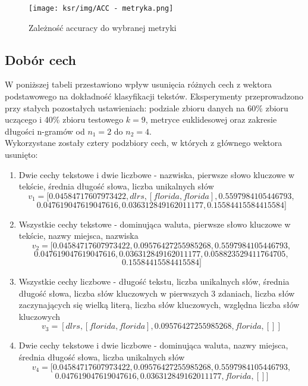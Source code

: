 \documentclass{article}
\begin{document}
\begin{figure}[H]
    \centering
    \texttt{[image: ksr/img/ACC - metryka.png]}
    \caption{Zależność accuracy do wybranej metryki}
    \label{fig:moj-obraz}
\end{figure}

\subsection{Dobór cech}
W poniższej tabeli przestawiono wpływ usunięcia różnych cech z wektora podstawowego na dokładność klasyfikacji tekstów. Eksperymenty przeprowadzono przy stałych pozostałych ustawieniach: podziale zbioru danych na 60\% zbioru uczącego i 40\% zbioru testowego \(k = 9\), metryce euklidesowej oraz zakresie długości n-gramów od \(n_1 = 2\) do \(n_2 = 4\). \\
Wykorzystane zostały cztery podzbiory cech, w których z głównego wektora usunięto:
\begin{enumerate}
    \item Dwie cechy tekstowe i dwie liczbowe - nazwiska, pierwsze słowo kluczowe w tekście, średnia długość słowa, liczba unikalnych słów
    \[
    v_1 = [ 0.04584717607973422, dlrs, [ florida, florida], 0.5597984105446793, 
    \]
    \[
         0.047619047619047616, 0.036312849162011177, 0.15584415584415584 ]
    \]
    \item Wszystkie cechy tekstowe - dominująca waluta, pierwsze słowo kluczowe w tekście, nazwy miejsca, nazwiska
    \[
    v_2 = [ 0.04584717607973422, 0.09576427255985268, 0.5597984105446793, 
    \]
    \[
          0.047619047619047616, 0.036312849162011177, 0.058823529411764705, 
    \]
    \[
        0.15584415584415584 ]
    \]
    \item Wszystkie cechy liczbowe - długość tekstu, liczba unikalnych słów, średnia długość słowa, liczba słów kluczowych w pierwszych 3 zdaniach, liczba słów zaczynających się wielką literą, liczba słów kluczowych, względna liczba słów kluczowych
    \[
    v_3 = [  dlrs, [ florida, florida], 0.09576427255985268, florida, [] ]
\]
    \item Dwie cechy tekstowe i dwie liczbowe - dominująca waluta, nazwy miejsca, średnia długość słowa, liczba unikalnych słów
    \[
    v_4 = [ 0.04584717607973422, 0.09576427255985268, 0.5597984105446793, 
\]
\[
     0.047619047619047616, 0.036312849162011177, florida, [] ]
\]
\end{enumerate}
\end{document}
